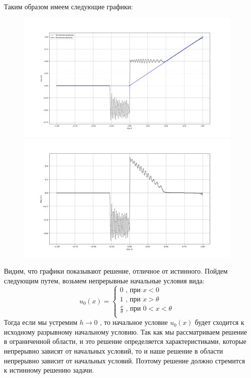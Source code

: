 \documentclass[a4paper,12pt]{article}
\begin{document}
Таким образом имеем следующие графики:
\begin{figure}[h]
    \begin{center}
    \begin{minipage}[h]{0.49\linewidth}
    \includegraphics[width=1\linewidth]{Figure_5.png}
    \end{minipage}
    \hfill
    \begin{minipage}[h]{0.5\linewidth}
    \includegraphics[width=1\linewidth]{Figure_8.png}
    \end{minipage}
    \hfill
    \end{center}
\end{figure}

Видим, что графики показывают решение, отличное от истинного. Пойдем следующим путем, возьмем непрерывные начальные условия вида:
\[
u_0(x)=\left\{
\begin{array}{l}
    0\text{ , при  } x<0 \\
    1\text{ , при  } x>\theta \\
    \frac{x}{\theta}\text{ , при  } 0<x<\theta \\
\end{array}    
\]
Тогда если мы устремим $h\rightarrow0$ , то начальное условие $u_0(x)$ будет сходится к исходному разрывному начальному условию. Так как мы рассматриваем решение в ограниченной области, и это решение определяется характеристиками, которые непрерывно зависят от начальных условий, то и наше решение в области непрерывно зависит от начальных условий. Поэтому решение должно стремится к истинному решению задачи.
\end{document}
